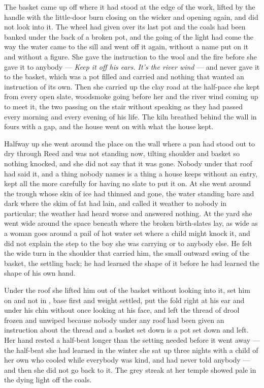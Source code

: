 The basket came up off  where it had stood at the edge of the work, lifted by the handle with the little-door burn closing on the wicker and opening again, and  did not look into it. The wheel had given over its last pot and the coals had been banked under the back of a broken pot, and the going of the light had come the way the water came to the sill and went off it again, without a name put on it and without a figure. She gave the instruction to the wool and the fire before she gave it to anybody --- \emph{Keep it off his ears. It's the river wind} --- and never gave it to the basket, which was a pot filled and carried and nothing that wanted an instruction of its own. Then she carried  up the clay road at the half-pace she kept from every open slate, woodsmoke going before her and the river wind coming up to meet it, the two passing on the stair without speaking as they had passed every morning and every evening of his life. The kiln breathed behind the wall in fours with a gap, and the house went on with what the house kept.

Halfway up she went around the place on the wall where a pan had stood out to dry through Reed and was not standing now, tilting shoulder and basket so nothing knocked, and she did not say that it was gone. Nobody under that roof had said it, and a thing nobody names is a thing a house keeps without an entry, kept all the more carefully for having no slate to put it on. At  she went around the trough whose skin of ice had thinned and gone, the water standing bare and dark where the skim of fat had lain, and called it weather to nobody in particular; the weather had heard worse and answered nothing. At the yard she went wide around the space beneath  where the broken birth-slates lay, as wide as a woman goes around a pail of hot water set where a child might knock it, and did not explain the step to the boy she was carrying or to anybody else. He felt the wide turn in the shoulder that carried him, the small outward swing of the basket, the settling back; he had learned the shape of it before he had learned the shape of his own hand.

Under the roof she lifted him out of the basket without looking into it, set him on  and not in , base first and weight settled, put the fold right at his ear and under his chin without once looking at his face, and left the thread of drool frozen and unwiped because nobody under any roof had been given an instruction about the thread and a basket set down is a pot set down and left. Her hand rested a half-beat longer than the setting needed before it went away --- the half-beat she had learned in the winter she sat up three nights with a child of her own who cooled while everybody was kind, and had never told anybody --- and then she did not go back to it. The grey streak at her temple showed pale in the dying light off the coals.

